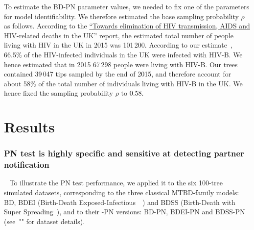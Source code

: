 \documentclass[10pt,letterpaper]{article}
\begin{document}
To estimate the BD-PN parameter values, we needed to fix one of the parameters for model identifiability. We therefore estimated the base sampling probability $\rho$ as follows. According to the \href{https://webarchive.nationalarchives.gov.uk/ukgwa/20181112132123mp_/https://assets.publishing.service.gov.uk/government/uploads/system/uploads/attachment_data/file/602942/HIV_in_the_UK_report.pdf}{``Towards elimination of HIV transmission, AIDS and HIV-related deaths in the UK''}
 report, the estimated total number of people living with HIV in the UK in 2015 was 101\,200. %
According to our estimate~\cite{zhukovaModelingDrugResistance2023}, 66.5\% of the HIV-infected individuals in the UK were infected with HIV-B. We hence estimated that in 2015 67\,298 %
people were living with HIV-B. Our trees contained 39\,047 tips sampled by the end of 2015, and therefore account for about 58\% %
of the total number of individuals living with HIV-B in the UK. We hence fixed the sampling probability $\rho$ to 0.58. %
 

\section*{Results}


\subsubsection*{PN test is highly specific and sensitive at detecting partner notification}~\label{sec:test}
To illustrate the PN test performance, we applied it to the six 100-tree simulated datasets, corresponding to the three classical MTBD-family models: BD, BDEI (Birth-Death Exposed-Infectious~~\cite{Stadler2014}) and BDSS (Birth-Death with Super Spreading~\cite{Stadler2013a}), and to their -PN versions: BD-PN, BDEI-PN and BDSS-PN (see~"" for dataset details).
\end{document}
